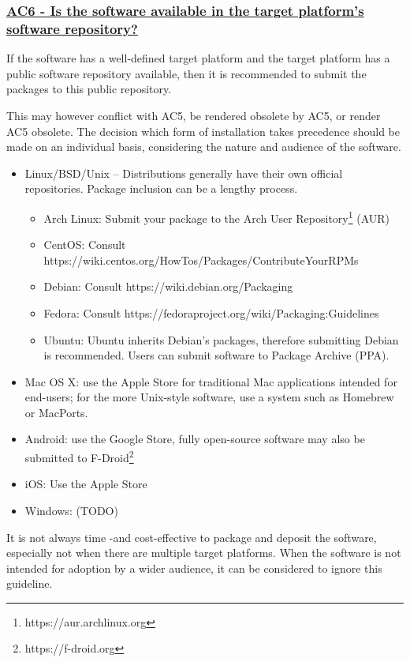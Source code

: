 \documentclass[a4paper,11pt]{article}
\newcommand{\indicator}[1]{\subsubsection*{\underline{#1}}}
\begin{document}
\indicator{AC6 - Is the software available in the target platform's software repository?}

If the software has a well-defined target platform and the target platform has
a public software repository available, then it is recommended to submit the
packages to this public repository.

This may however conflict with AC5, be rendered obsolete by AC5, or render AC5
obsolete. The decision which form of installation takes precedence should be
made on an individual basis, considering the nature and audience of the
software.

\begin{itemize}
    \item Linux/BSD/Unix -- Distributions generally have their own official repositories. Package inclusion can be a lengthy process.
    \begin{itemize}
        \item Arch Linux: Submit your package to the Arch User Repository\footnote{https://aur.archlinux.org} (AUR)
		\item CentOS: Consult https://wiki.centos.org/HowTos/Packages/ContributeYourRPMs
        \item Debian: Consult https://wiki.debian.org/Packaging
        \item Fedora: Consult https://fedoraproject.org/wiki/Packaging:Guidelines
        \item Ubuntu: Ubuntu inherits Debian's packages, therefore submitting Debian is recommended. Users can submit software  to Package Archive (PPA).
    \end{itemize}
    \item Mac OS X: use the Apple Store for traditional Mac applications intended for end-users; for the more Unix-style
        software, use a system such as Homebrew or MacPorts.
    \item Android: use the Google Store, fully open-source software may also be submitted to F-Droid\footnote{https://f-droid.org}
    \item iOS: Use the Apple Store
    \item Windows: (TODO) 
\end{itemize}

It is not always time -and cost-effective to package and deposit the software,
especially not when there are multiple target platforms. When the software is
not intended for adoption by a wider audience, it can be considered to ignore
this guideline.
\end{document}

